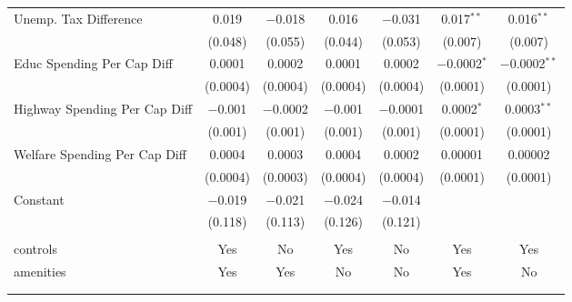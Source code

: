\begin{table}[!htbp]
\begin{tabular}{@{\extracolsep{5pt}}lcccccc}
  Unemp. Tax Difference & 0.019 & $-$0.018 & 0.016 & $-$0.031 & 0.017$^{**}$ & 0.016$^{**}$ \\ 
  & (0.048) & (0.055) & (0.044) & (0.053) & (0.007) & (0.007) \\ 
  Educ Spending Per Cap Diff & 0.0001 & 0.0002 & 0.0001 & 0.0002 & $-$0.0002$^{*}$ & $-$0.0002$^{**}$ \\ 
  & (0.0004) & (0.0004) & (0.0004) & (0.0004) & (0.0001) & (0.0001) \\ 
  Highway Spending Per Cap Diff & $-$0.001 & $-$0.0002 & $-$0.001 & $-$0.0001 & 0.0002$^{*}$ & 0.0003$^{**}$ \\ 
  & (0.001) & (0.001) & (0.001) & (0.001) & (0.0001) & (0.0001) \\ 
  Welfare Spending Per Cap Diff & 0.0004 & 0.0003 & 0.0004 & 0.0002 & 0.00001 & 0.00002 \\ 
  & (0.0004) & (0.0003) & (0.0004) & (0.0004) & (0.0001) & (0.0001) \\ 
  Constant & $-$0.019 & $-$0.021 & $-$0.024 & $-$0.014 &  &  \\ 
  & (0.118) & (0.113) & (0.126) & (0.121) &  &  \\ 
 \hline \\[-1.8ex] 
controls & Yes & No & Yes & No & Yes & Yes \\ 
amenities & Yes & Yes & No & No & Yes & No \\ 
\hline \\[-1.8ex] 
\hline 
\hline \\[-1.8ex] 
\end{tabular} 
\end{table} 
